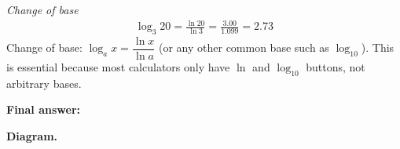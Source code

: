 \documentclass[11pt]{article}
\begin{document}
\textit{Change of base}
\[\begin{gathered}
\log_3 20 = \frac{\ln 20}{\ln 3} = \frac{3.00}{1.099} = 2.73
\end{gathered}\]
Change of base: \( \log_a x = \dfrac{\ln x}{\ln a} \) (or any other common base such as \( \log_{10} \)). This is essential because most calculators only have \( \ln \) and \( \log_{10} \) buttons, not arbitrary bases.

\begin{answerbox}
\textbf{Final answer:}
\end{answerbox}
\textbf{Diagram.}

\begin{center}
\end{center}
\end{document}
